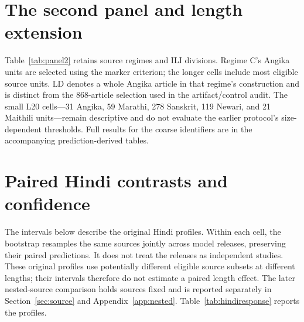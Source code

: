 \documentclass[final]{clv2025}
\newcommand{\fitexhibit}[1]{\sbox{\exhibitbox}{}\ifdim\wd\exhibitbox>\linewidth\resizebox{\linewidth}{!}{\usebox{\exhibitbox}}\else\usebox{\exhibitbox}\fi}
\newcommand{\exhibit}[1]{\fitexhibit{tables/#1.tex}}
\begin{document}
\FloatBarrier
\section{The second panel and length extension}\label{app:panel2}

Table~\ref{tab:panel2} retains source regimes and ILI divisions. Regime C's Angika units are selected using the marker criterion; the longer cells include most eligible source units. LD denotes a whole Angika article in that regime's construction and is distinct from the 868-article selection used in the artifact/control audit. The small L20 cells---31 Angika, 59 Marathi, 278 Sanskrit, 119 Newari, and 21 Maithili units---remain descriptive and do not evaluate the earlier protocol's size-dependent thresholds. Full results for the coarse identifiers are in the accompanying prediction-derived tables.

\begin{table}[htbp]
\centering\small\setlength{\tabcolsep}{4pt}
\exhibit{panel2_retention}
\caption{Per-language retention in Panel 2 and the separate Wikipedia L20 extension. Dashes denote unavailable label coverage. The ILI test cells retain their original split identity after filtering.}
\label{tab:panel2}
\end{table}

\FloatBarrier
\section{Paired Hindi contrasts and confidence}\label{app:confidence}

The intervals below describe the original Hindi profiles. Within each cell, the bootstrap resamples the same sources jointly across model releases, preserving their paired predictions. It does not treat the releases as independent studies. These original profiles use potentially different eligible source subsets at different lengths; their intervals therefore do not estimate a paired length effect. The later nested-source comparison holds sources fixed and is reported separately in Section~\ref{sec:source} and Appendix~\ref{app:nested}. Table~\ref{tab:hindiresponse} reports the profiles.

\begin{table}[htbp]
\centering\footnotesize\setlength{\tabcolsep}{3pt}
\exhibit{hindi_release_contrasts}
\caption{Hindi retention and paired release differences. Bracketed intervals are conditional 95\% source-resampling intervals. Each row holds 2,000 units.}
\label{tab:hindiresponse}
\end{table}
\end{document}
